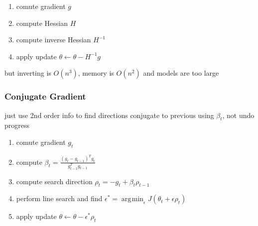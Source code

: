 \documentclass[]{article}
\DeclareMathOperator*{\argmin}{\arg\!\min}
\begin{document}
\begin{enumerate}
    \item comute gradient $g$
    \item compute Hessian $H$
    \item compute inverse Hessian $H^{-1}$
    \item apply update $\theta \gets \theta - H^{-1} g$
\end{enumerate}
but inverting is $O(n^3)$, memory is $O(n^2)$ and models are too large 

\subsubsection{Conjugate Gradient}
just use 2nd order info to find directions conjugate to previous using $\beta_t$, not undo progress

\begin{enumerate}
    \item comute gradient $g_t$
    \item compute $\beta_t = \frac{(g_t - g_{t-1})^T g_t}{g_{t-1}^Tg_{t-1}} $
    \item compute search direction $\rho_t = -g_t + \beta_t \rho_{t-1}$
    \item perform line search and find $\epsilon^* = \argmin_\epsilon J(\theta_t + \epsilon \rho_t)$
    \item apply update $\theta \gets \theta - \epsilon^* \rho_t$
\end{enumerate}
\end{document}
